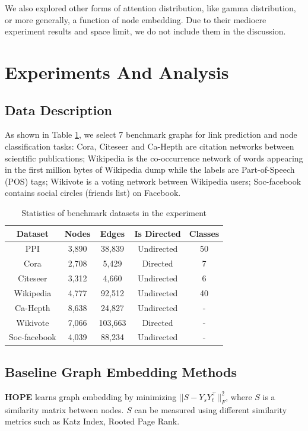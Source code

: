 \documentclass{article}
\begin{document}
We also explored other forms of attention distribution, like gamma distribution, or more generally, a function of node embedding. Due to their mediocre experiment results and space limit, we do not include them in the discussion.

\section{Experiments And Analysis}
\subsection{Data Description}
As shown in Table \ref{tab:datasets}, we select 7 benchmark graphs for link prediction and node classification tasks: Cora, Citeseer and Ca-Hepth are citation networks between scientific publications; Wikipedia is the co-occurrence network of words appearing in the first million bytes of Wikipedia dump while the labels are Part-of-Speech (POS) tags; Wikivote is a voting network between Wikipedia users; Soc-facebook contains social circles (friends list) on Facebook. 

\begin{table}[ht]
\caption{Statistics of benchmark datasets in the experiment}
\label{tab:datasets}
\centering
\begin{tabular}{c|c|c|c|c}
\toprule
Dataset & Nodes  & Edges & Is Directed & Classes\\
\midrule
PPI & 3,890  & 38,839 & Undirected & 50\\
Cora & 2,708  & 5,429 & Directed & 7\\
Citeseer & 3,312 & 4,660 & Undirected & 6\\
Wikipedia & 4,777 & 92,512 & Undirected & 40 \\
Ca-Hepth & 8,638 & 24,827 & Undirected & -\\
Wikivote & 7,066 & 103,663 & Directed & -\\
Soc-facebook & 4,039 & 88,234 & Undirected & -\\
\bottomrule
\end{tabular}
\end{table}

\subsection{Baseline Graph Embedding Methods}


\textbf{HOPE\cite{ou2016asymmetric}} learns graph embedding by minimizing $||S - Y_sY_t^\intercal||_F^2$, where $S$ is a similarity matrix between nodes. $S$ can be measured using different similarity metrics such as Katz Index, Rooted Page Rank. 
\end{document}
